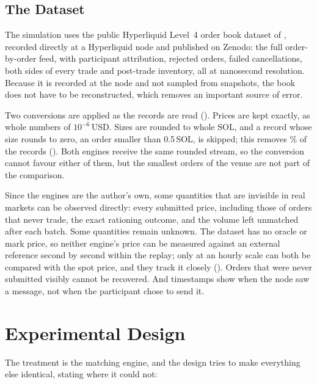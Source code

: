 \subsection{The Dataset}
\label{sec:dataset}

The simulation uses the public Hyperliquid Level~4 order book dataset of
\citet{albers2026openbook}, recorded directly at a Hyperliquid node and
published on Zenodo: the full order-by-order feed, with participant
attribution, rejected orders, failed cancellations, both sides of every
trade and post-trade inventory, all at nanosecond resolution. Because it is
recorded at the node and not sampled from snapshots, the book does not have
to be reconstructed, which removes an important source of error.

Two conversions are applied as the records are read
(). Prices are kept exactly, as whole numbers of
$10^{-6}$\,USD. Sizes are rounded to whole SOL, and a record whose size
rounds to zero, an order smaller than 0.5\,SOL, is skipped; this removes
\SampleSkippedPct\% of the records (). Both engines receive
the same rounded stream, so the conversion cannot favour either of them, but
the smallest orders of the venue are not part of the comparison.

Since the engines are the author's own, some quantities that are invisible in
real markets can be observed directly: every submitted price, including those
of orders that never trade, the exact rationing outcome, and the volume left
unmatched after each batch. Some quantities remain unknown. The dataset has no
oracle or mark price, so neither engine's price can be measured against an
external reference second by second within the replay; only at an hourly
scale can both be compared with the spot price, and they track it closely
().
Orders that were never submitted visibly cannot be recovered. And timestamps
show when the node saw a message, not when the participant chose to send it.

\section{Experimental Design}
\label{sec:experiments}

The treatment is the matching engine, and the design tries to make everything
else identical, stating where it could not:

